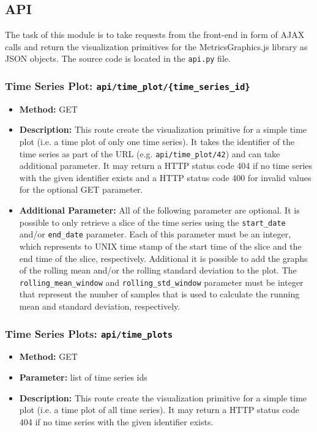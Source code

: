 \documentclass[11pt, a4paper]{article}
\begin{document}
\subsection{API}
The task of this module is to take requests from the front-end in form of AJAX calls and return the visualization primitives for the MetricsGraphics.js library as JSON objects.
The source code is located in the \texttt{api.py} file.

\subsubsection*{Time Series Plot: \texttt{api/time\_plot/\{time\_series\_id\}}}
\begin{itemize}
 \item[] \textbf{Method:} GET 
 \item[] \textbf{Description:} This route create the visualization primitive for a simple time plot (i.e. a time plot of only one time series).
 It takes the identifier of the time series as part of the URL (e.g. \texttt{api/time\_plot/42}) and can take additional parameter.
 It may return a HTTP status code 404 if no time series with the given identifier exists and a HTTP status code 400 for invalid values for the optional GET parameter.
 \item[] \textbf{Additional Parameter:} All of the following parameter are optional.
 It is possible to only retrieve a slice of the time series using the \texttt{start\_date} and/or \texttt{end\_date} parameter.
 Each of this parameter must be an integer, which represents to UNIX time stamp of the start time of the slice and the end time of the slice, respectively. 
 Additional it is possible to add the graphs of the rolling mean and/or the rolling standard deviation to the plot.
 The \texttt{rolling\_mean\_window} and \texttt{rolling\_std\_window} parameter must be integer that represent the number of samples that is used to calculate the running mean and standard deviation, respectively.
\end{itemize}

\subsubsection*{Time Series Plots: \texttt{api/time\_plots}}
\begin{itemize}
 \item[] \textbf{Method:} GET 
 \item[] \textbf{Parameter:} list of time series ids
 \item[] \textbf{Description:} This route create the visualization primitive for a simple time plot (i.e. a time plot of all time series).
 It may return a HTTP status code 404 if no time series with the given identifier exists.
\end{itemize}
\end{document}
